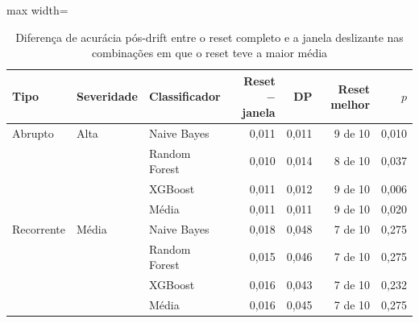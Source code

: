 \begin{table}[htbp]
\centering
\small
\caption{Diferença de acurácia pós-drift entre o reset completo e a janela deslizante nas combinações em que o reset teve a maior média}
\label{tab:reset-vs-janela}
\begin{adjustbox}{max width=\textwidth}
\begin{tabular}{lllrrrr}
\toprule
Tipo & Severidade & Classificador & Reset $-$ janela & DP & Reset melhor & $p$ \\
\midrule
Abrupto & Alta & Naive Bayes & 0,011 & 0,011 & 9 de 10 & 0,010 \\
 &  & Random Forest & 0,010 & 0,014 & 8 de 10 & 0,037 \\
 &  & XGBoost & 0,011 & 0,012 & 9 de 10 & 0,006 \\
 &  & Média & 0,011 & 0,011 & 9 de 10 & 0,020 \\
Recorrente & Média & Naive Bayes & 0,018 & 0,048 & 7 de 10 & 0,275 \\
 &  & Random Forest & 0,015 & 0,046 & 7 de 10 & 0,275 \\
 &  & XGBoost & 0,016 & 0,043 & 7 de 10 & 0,232 \\
 &  & Média & 0,016 & 0,045 & 7 de 10 & 0,275 \\
\bottomrule
\end{tabular}
\end{adjustbox}
\par\vspace{2pt}{\footnotesize Diferenças pareadas por repetição; $p$: teste de Wilcoxon pareado, sem correção para comparações múltiplas.}
\end{table}
